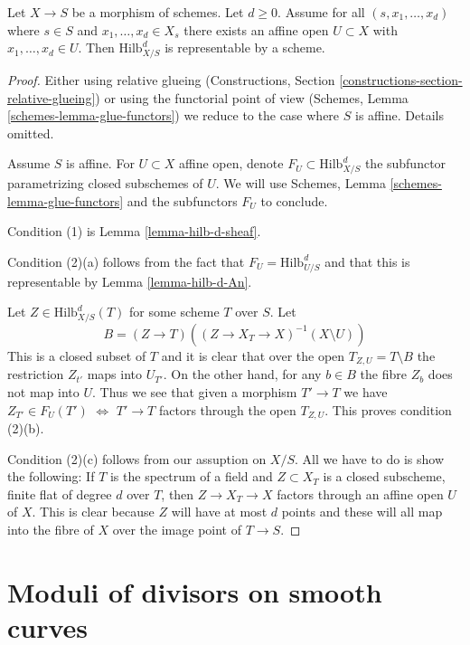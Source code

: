 \begin{proposition}
\label{proposition-hilb-d-representable}
Let $X \to S$ be a morphism of schemes. Let $d \geq 0$. Assume
for all $(s, x_1, \ldots, x_d)$ where $s \in S$ and
$x_1, \ldots, x_d \in X_s$ there exists an affine open $U \subset X$
with $x_1, \ldots, x_d \in U$. Then $\text{Hilb}^d_{X/S}$ is
representable by a scheme.
\end{proposition}

\begin{proof}
Either using relative glueing (Constructions, Section
\ref{constructions-section-relative-glueing}) or using
the functorial point of view
(Schemes, Lemma \ref{schemes-lemma-glue-functors})
we reduce to the case where $S$ is affine. Details omitted.

\medskip\noindent
Assume $S$ is affine. For $U \subset X$ affine open, denote
$F_U \subset \text{Hilb}^d_{X/S}$ the subfunctor parametrizing
closed subschemes of $U$. We will use
Schemes, Lemma \ref{schemes-lemma-glue-functors}
and the subfunctors $F_U$ to conclude.

\medskip\noindent
Condition (1) is Lemma \ref{lemma-hilb-d-sheaf}.

\medskip\noindent
Condition (2)(a) follows from the fact that
$F_U = \text{Hilb}^d_{U/S}$ and that this is representable
by Lemma \ref{lemma-hilb-d-An}.

\medskip\noindent
Let $Z \in \text{Hilb}^d_{X/S}(T)$ for some scheme $T$ over $S$. Let
$$
B = (Z \to T)\left((Z \to X_T \to X)^{-1}(X \setminus U)\right)
$$
This is a closed subset of $T$ and it is clear that over the open
$T_{Z, U} = T \setminus B$ the restriction $Z_{t'}$ maps into $U_{T'}$.
On the other hand, for any $b \in B$ the fibre $Z_b$ does not map
into $U$. Thus we see that given a morphism $T' \to T$ we
have $Z_{T'} \in F_U(T')$ $\Leftrightarrow$ $T' \to T$ factors through
the open $T_{Z, U}$. This proves condition (2)(b).

\medskip\noindent
Condition (2)(c) follows from our assuption on $X/S$. All we have
to do is show the following: If $T$ is the spectrum of a field
and $Z \subset X_T$ is a closed subscheme, finite flat of degree
$d$ over $T$, then $Z \to X_T \to X$ factors through an affine open
$U$ of $X$. This is clear because $Z$ will have at most $d$ points
and these will all map into the fibre of $X$ over the image point
of $T \to S$.
\end{proof}




\section{Moduli of divisors on smooth curves}
\label{section-divisors}

